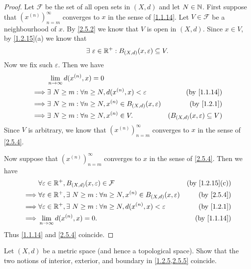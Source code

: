 \begin{proof}
  Let \(\mathcal{F}\) be the set of all open sets in \((X, d)\) and let \(N \in \mathbb{N}\).
  First suppose that \((x^{(n)})_{n = m}^\infty\) converges to \(x\) in the sense of \cref{1.1.14}.
  Let \(V \in \mathcal{F}\) be a neighbourhood of \(x\).
  By \cref{2.5.2} we know that \(V\) is open in \((X, d)\).
  Since \(x \in V\), by \cref{1.2.15}(a) we know that
  \[
    \exists\ \varepsilon \in \mathbb{R}^+ : B_{(X, d)}(x, \varepsilon) \subseteq V.
  \]
  Now we fix such \(\varepsilon\).
  Then we have
  \begin{align*}
             & \lim_{n \to \infty} d(x^{(n)}, x) = 0                                                                                   \\
    \implies & \exists\ N \geq m : \forall n \geq N, d(x^{(n)}, x) < \varepsilon            & \text{(by \cref{1.1.14})}                \\
    \implies & \exists\ N \geq m : \forall n \geq N, x^{(n)} \in B_{(X, d)}(x, \varepsilon) & \text{(by \cref{1.2.1})}                 \\
    \implies & \exists\ N \geq m : \forall n \geq N, x^{(n)} \in V.                         & (B_{(X, d)}(x, \varepsilon) \subseteq V)
  \end{align*}
  Since \(V\) is arbitrary, we know that \((x^{(n)})_{n = m}^\infty\) converges to \(x\) in the sense of \cref{2.5.4}.

  Now suppose that \((x^{(n)})_{n = m}^\infty\) converges to \(x\) in the sense of \cref{2.5.4}.
  Then we have
  \begin{align*}
             & \forall \varepsilon \in \R^+, B_{(X, d)}(x, \varepsilon) \in \mathcal{F}                                   & \text{(by \cref{1.2.15}(c))} \\
    \implies & \forall \varepsilon \in \R^+, \exists\ N \geq m : \forall n \geq N, x^{(n)} \in B_{(X, d)}(x, \varepsilon) & \text{(by \cref{2.5.4})}     \\
    \implies & \forall \varepsilon \in \R^+, \exists\ N \geq m : \forall n \geq N, d(x^{(n)}, x) < \varepsilon            & \text{(by \cref{1.2.1})}     \\
    \implies & \lim_{n \to \infty} d(x^{(n)}, x) = 0.                                                                     & \text{(by \cref{1.1.14})}
  \end{align*}
  Thus \cref{1.1.14} and \cref{2.5.4} coincide.
\end{proof}

\begin{ex}\label{ex:2.5.3}
  Let \((X, d)\) be a metric space (and hence a topological space).
  Show that the two notions of interior, exterior, and boundary in \cref{1.2.5,2.5.5} coincide.
\end{ex}

